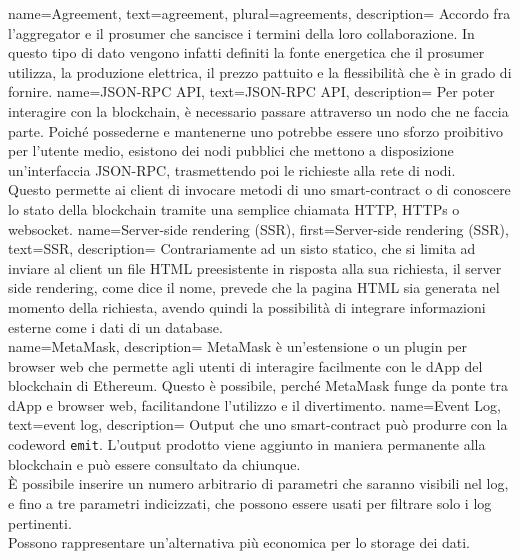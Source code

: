 {
    name={Agreement},
    text={agreement},
    plural={agreements},
    description={
            Accordo fra l'\gls{aggregator} e il \gls{prosumer} che sancisce i termini della loro collaborazione.
            In questo tipo di dato vengono infatti definiti la fonte energetica che il \gls{prosumer} utilizza,
            la produzione elettrica, il prezzo pattuito e la flessibilità che è in grado di fornire.
        }
}
{
    name={JSON-RPC API},
    text={JSON-RPC API},
    description={
            Per poter interagire con la blockchain, è necessario passare attraverso un nodo che ne faccia parte.
            Poiché possederne e mantenerne uno potrebbe essere uno sforzo proibitivo per l'utente medio, esistono dei nodi pubblici
            che mettono a disposizione un'interfaccia JSON-RPC, trasmettendo poi le richieste alla rete di nodi. \\
            Questo permette ai client di invocare metodi di uno \gls{smart-contract} o di conoscere lo stato della blockchain tramite una semplice chiamata HTTP, HTTPs o websocket.
        }
}
{
    name={Server-side rendering (SSR)},
    first={Server-side rendering (SSR)},
    text={SSR},
    description={
            Contrariamente ad un sisto statico, che si limita ad inviare al client un file HTML preesistente in risposta alla sua richiesta,
            il server side rendering, come dice il nome, prevede che la pagina HTML sia generata nel momento della richiesta, avendo quindi la possibilità di integrare informazioni esterne come i dati di un database. \\
        }
}
{
    name={MetaMask},
    description={
            MetaMask è un'estensione o un plugin per browser web che permette agli utenti di interagire facilmente con le dApp del blockchain di Ethereum.
            Questo è possibile, perché MetaMask funge da ponte tra dApp e browser web, facilitandone l'utilizzo e il divertimento.}
}
{
    name={Event Log},
    text={event log},
    description={
            Output che uno \gls{smart-contract} può produrre con la codeword \texttt{emit}.
            L'output prodotto viene aggiunto in maniera permanente alla blockchain e può essere consultato da chiunque. \\
            È possibile inserire un numero arbitrario di parametri che saranno visibili nel log, e fino a tre parametri indicizzati,
            che possono essere usati per filtrare solo i log pertinenti. \\
            Possono rappresentare un'alternativa più economica per lo storage dei dati.
        }
}
